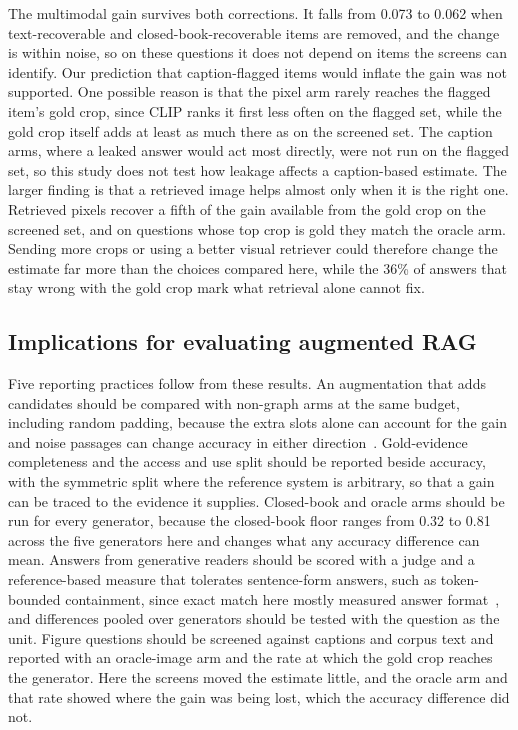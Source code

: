 \documentclass[preprint,12pt]{elsarticle}
\begin{document}
The multimodal gain survives both corrections. It falls from 0.073 to 0.062 when
text-recoverable and closed-book-recoverable items are removed, and the change is
within noise, so on these questions it does not depend on items the screens can
identify. Our prediction that caption-flagged items would inflate the gain was not
supported. One possible reason is that the pixel arm rarely reaches the flagged
item's gold crop, since CLIP ranks it first less often on the flagged set, while
the gold crop itself adds at least as much there as on the screened set. The caption
arms, where a leaked answer would act most directly, were not run on the flagged
set, so this study does not test how leakage affects a caption-based estimate.
The larger finding is that a retrieved image helps almost only when it is the right
one. Retrieved pixels recover a fifth of the gain available from the gold crop on
the screened set, and on questions whose top crop is gold they match the oracle
arm. Sending more crops or using a better visual retriever could therefore change
the estimate far more than the choices compared here, while the 36\% of answers
that stay wrong with the gold crop mark what retrieval alone cannot fix.

\subsection{Implications for evaluating augmented RAG}

Five reporting practices follow from these results. An augmentation that adds
candidates should be compared with non-graph arms at the same budget,
including random padding, because the extra slots alone can account for the
gain and noise passages can change accuracy in either
direction~\cite{cuconasu2024noise}. Gold-evidence completeness and the access
and use split should be reported beside accuracy, with the symmetric split
where the reference system is arbitrary, so that a gain can be traced to the
evidence it supplies. Closed-book and oracle arms should be run for every
generator, because the closed-book floor ranges from 0.32 to 0.81 across the
five generators here and changes what any accuracy difference can mean.
Answers from generative readers should be scored with a judge and a
reference-based measure that tolerates sentence-form answers, such as
token-bounded containment, since exact match here mostly measured answer
format~\cite{kamalloo2023evaluating}, and differences pooled over generators
should be tested with the question as the unit. Figure questions should be
screened against captions and corpus text and reported with an oracle-image arm
and the rate at which the gold crop reaches the generator. Here the screens moved
the estimate little, and the oracle arm and that rate showed where the gain was
being lost, which the accuracy difference did not.
\end{document}
